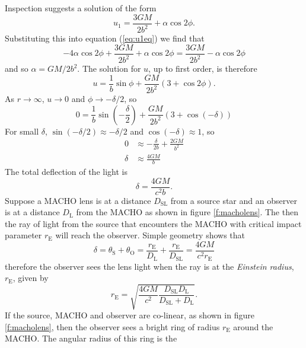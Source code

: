 Inspection suggests a solution of the form
\begin{equation}
u_1 = \frac{3GM}{2b^2} + \alpha \cos 2\phi.
\end{equation}
Substituting this into equation (\ref{eq:u1eq}) we find that
\begin{equation}
-4\alpha \cos 2\phi + \frac{3GM}{2b^2} + \alpha\cos 2\phi =
\frac{3GM}{2b^2} - \alpha\cos 2\phi
\end{equation}
and so $\alpha = GM/2b^2$. The solution for $u$, up to first order, is
therefore
\begin{equation}
u = \frac{1}{b} \sin \phi + \frac{GM}{2b^2}\left(3 + \cos 2\phi\right).
\end{equation}
As $r \rightarrow \infty$, $u \rightarrow 0$ and $\phi \rightarrow - \delta/2$,
so
\begin{equation}
0 = \frac{1}{b} \sin \left(-\frac{\delta}{2}\right) + 
\frac{GM}{2b^2} \left(3 + \cos(-\delta)\right)
\end{equation}
For small $\delta$, $\sin(-\delta/2) \approx -\delta/2$ and $\cos(-\delta)
\approx 1$, so
\begin{align}
0 &\approx - \frac{\delta}{2b} + \frac{2GM}{b^2} \\
\delta &\approx \frac{4GM}{b}
\end{align}
The total deflection of the light is
\begin{equation}
\delta = \frac{4GM}{c^2 b}.
\end{equation}
Suppose a MACHO lens is at a distance $D_\mathrm{SL}$ from a source star and
an observer is at a distance $D_\mathrm{L}$ from the MACHO as shown in figure
\ref{f:macholens}. The then the ray of light from the source that encounters
the MACHO with critical impact parameter $r_\mathrm{E}$ will reach the
observer. Simple geometry shows that
\begin{equation}
\delta = \theta_\mathrm{S} + \theta_\mathrm{O} =
\frac{r_\mathrm{E}}{D_\mathrm{L}} + \frac{r_\mathrm{E}}{D_\mathrm{SL}} =
\frac{4GM}{c^2r_\mathrm{E}}
\end{equation}
therefore the observer sees the lens light when the ray is at the
\emph{Einstein radius}, $r_\mathrm{E}$, given by
\begin{equation}
r_\mathrm{E} = \sqrt{\frac{4GM}{c^2} \frac{D_\mathrm{SL} D_\mathrm{L}}
{D_\mathrm{SL} + D_\mathrm{L}}}.
\end{equation}
If the source, MACHO and observer are co-linear, as shown in figure
\ref{f:macholens}, then the observer sees a bright ring of radius
$r_\mathrm{E}$ around the MACHO. The angular radius of this ring is the

